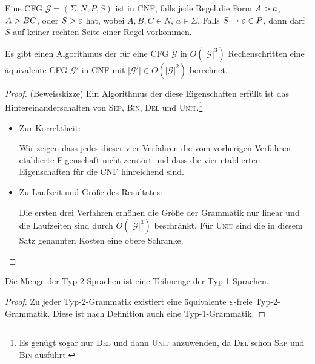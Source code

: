 \begin{Def}[name={[\acs*{CFG} in \acs*{CNF}]}]
	Eine \ac{CFG} $\mathcal{G} = (\Sigma, N, P, S)$ ist in \ac{CNF}, falls jede
  Regel die Form $A\->a$, $A\->BC$, oder $S \-> \varepsilon$ hat, wobei $A,B,C\in N$, $a\in\Sigma$.
  Falls $S \to \varepsilon \in P$, dann darf $S$ auf keiner rechten Seite einer Regel vorkommen.
\end{Def}
\begin{Satz}\label{satz:CFGtoCNF}
Es gibt einen Algorithmus der für eine \ac{CFG} $\mathcal{G}$ in $O(|\mathcal{G}|^3)$ Rechenschritten eine äquivalente \ac{CFG} $\mathcal{G}'$ in CNF mit $|\mathcal{G}'|\in O(|\mathcal{G}|^2)$ berechnet.
\end{Satz}

\begin{proof} (Beweisskizze)
	Ein Algorithmus der diese Eigenschaften erfüllt ist das Hintereinanderschalten von \textsc{Sep}, \textsc{Bin}, \textsc{Del} und \textsc{Unit}.\footnote{Es genügt sogar nur \textsc{Del} und dann \textsc{Unit} anzuwenden, da \textsc{Del} schon \textsc{Sep} und \textsc{Bin} ausführt.}
		\begin{itemize}
	\item Zur Korrektheit:
	
	Wir zeigen dass jedes dieser vier Verfahren die vom vorherigen Verfahren etablierte Eigenschaft nicht zerstört und dass die vier etablierten Eigenschaften für die \ac{CNF} hinreichend sind.
	
	\item Zu Laufzeit und Größe des Resultates:
	
	Die ersten drei Verfahren erhöhen die Größe der Grammatik nur linear und die Laufzeiten sind durch $O(|\mathcal{G}|^3)$ beschränkt. 
	Für \textsc{Unit} sind die in diesem Satz genannten Kosten eine obere Schranke. 
	\qedhere
	\end{itemize}
\end{proof}
	

\begin{lemma}
 Die Menge der Typ-2-Sprachen ist eine Teilmenge der Typ-1-Sprachen.
\end{lemma}
\begin{proof}
 Zu jeder Typ-2-Grammatik existiert eine äquivalente $\varepsilon$-freie Typ-2-Grammatik.
 Diese ist nach Definition auch eine Typ-1-Grammatik.
\end{proof}






